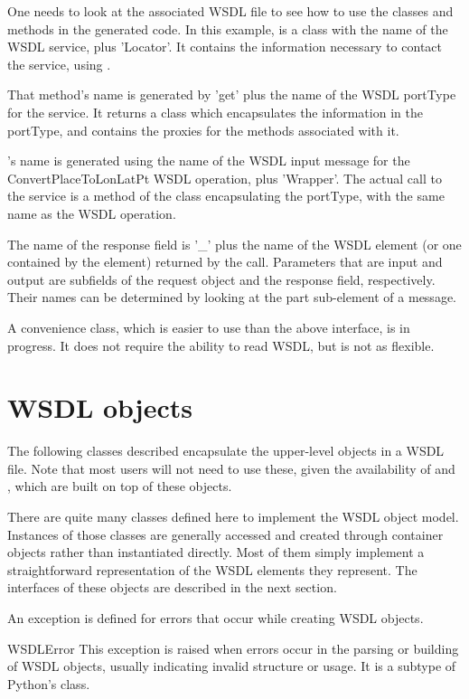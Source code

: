 One needs to look at the associated WSDL file to see how
to use the classes and methods in the generated code.
In this example, 
is a class with the name of the WSDL service, plus 'Locator'.  It contains the
information necessary to contact the service, using
.

That method's name is generated by 'get' plus the name of the WSDL portType
for the service.  It returns a class which
encapsulates the information in the portType, and contains the proxies
for the methods associated with it.

's
name is generated using
the name of the WSDL input message for the ConvertPlaceToLonLatPt
WSDL operation, plus 'Wrapper'.  The actual call to the service is a method of
the class encapsulating the portType, with the same name as the WSDL operation.

The name of the response field is '_' plus the name of the
WSDL element (or one contained by the element) returned by the call.
Parameters that are input and output are subfields of
the request object and the response field, respectively. 
Their names can be determined by looking at the part sub-element of a
message.

A convenience class, which is easier to use than the above interface,
is in progress.  It does not require the ability to read WSDL, but
is not as flexible.

\section{WSDL objects}

The following classes described encapsulate the upper-level objects
in a WSDL file.  Note that most users will not need to use these,
given the availability of  and
, which are built on top of these objects.

There are quite many classes defined here to
implement the WSDL object model. Instances of those classes are generally 
accessed and created through container objects rather than instantiated 
directly. Most of them simply implement a straightforward representation of 
the WSDL elements they represent. The interfaces of these objects are 
described in the next section.

An exception is defined for errors that occur while creating WSDL objects.

\begin{excdesc}{WSDLError}
This exception is raised when errors occur in the parsing or building of 
WSDL objects, usually indicating invalid structure or usage.
It is a subtype of Python's  class.
\end{excdesc}


